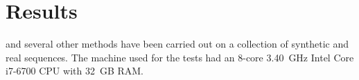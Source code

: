 \clearpage
\section{Results}
\label{sec:results}
\smashpp and several other methods have been carried out on a collection of synthetic and real sequences. The machine used for the tests had an 8-core 3.40~GHz Intel\textsuperscript{\textregistered} Core\texttrademark\xspace i7-6700 CPU with 32~GB RAM.